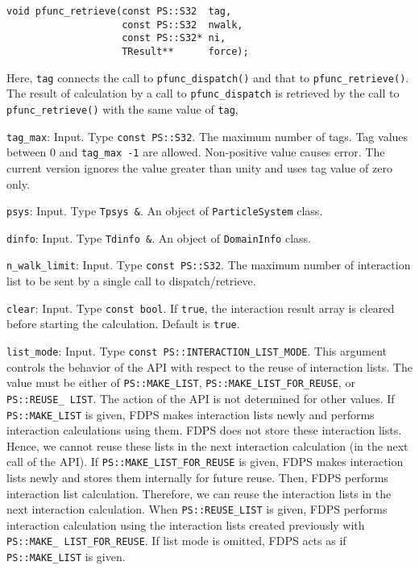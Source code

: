 \begin{itemize}
\begin{verbatim}
void pfunc_retrieve(const PS::S32  tag,
                    const PS::S32  nwalk,
                    const PS::S32* ni,
                    TResult**      force);
\end{verbatim}

Here, \texttt{tag} connects the call to \texttt{pfunc\_dispatch()} and that to \texttt{pfunc\_retrieve()}. The result of calculation by a call to \texttt{pfunc\_dispatch} is retrieved by the call to  \texttt{pfunc\_retrieve()} with the same value of \texttt{tag},

\texttt{tag\_max}: Input. Type \texttt{const PS::S32}. The maximum number of tags. Tag values between 0 and \texttt{tag\_max -1} are allowed. Non-positive value causes error. The current version ignores the value greater than unity and uses tag value of zero only.

\texttt{psys}: Input. Type \texttt{Tpsys \&}. An object of \texttt{ParticleSystem} class.

\texttt{dinfo}: Input. Type \texttt{Tdinfo \&}. An object of \texttt{DomainInfo} class.

\texttt{n\_walk\_limit}: Input. Type \texttt{const PS::S32}. The maximum number of interaction list to be sent by a single call to dispatch/retrieve.

\texttt{clear}: Input. Type \texttt{const bool}. If \texttt{true}, the interaction result array is cleared before starting the calculation. Default is \texttt{true}.

\texttt{list\_mode}: Input. Type \texttt{const PS::INTERACTION\_LIST\_MODE}. This argument controls the behavior of the API with respect to the reuse of interaction lists. The value must be either of \texttt{PS::MAKE\_LIST}, \texttt{PS::MAKE\_LIST\_FOR\_REUSE}, or \texttt{PS::REUSE\_ LIST}. The action of the API is not determined for other values. If \texttt{PS::MAKE\_LIST} is given, FDPS makes interaction lists newly and performs interaction calculations using them. FDPS does not store these interaction lists. Hence, we cannot reuse these lists in the next interaction calculation (in the next call of the API). If \texttt{PS::MAKE\_LIST\_FOR\_REUSE} is given, FDPS makes interaction lists newly and stores them internally for future reuse. Then, FDPS performs interaction list calculation. Therefore, we can reuse the interaction lists in the next interaction calculation. When \texttt{PS::REUSE\_LIST} is given, FDPS performs interaction calculation using the interaction lists created previously with \texttt{PS::MAKE\_ LIST\_FOR\_REUSE}. If list mode is omitted, FDPS acts as if \texttt{PS::MAKE\_LIST} is given. 


\end{itemize}
